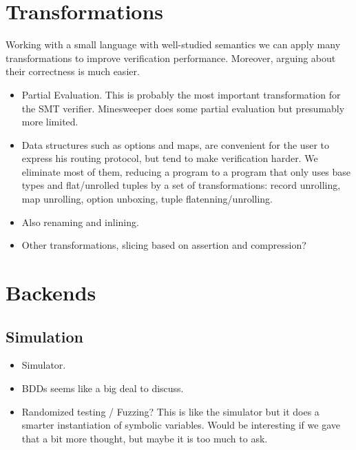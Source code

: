 \documentclass[sigconf,10pt]{acmart}
\begin{document}
%
%
%
%
\section{Transformations}
\label{sec:transformations}

Working with a small language with well-studied semantics we can apply many
transformations to improve verification performance. Moreover, arguing about their correctness is much easier.
\begin{itemize}
  \item Partial Evaluation. This is probably the most important transformation for the SMT verifier. Minesweeper does some partial evaluation but presumably more limited.
  \item Data structures such as options and maps, are convenient for the user to express his routing protocol, but tend to make verification harder. We eliminate most of them, reducing a program to a program that only uses base types and flat/unrolled tuples by a set of transformations: record unrolling, map unrolling, option unboxing, tuple flatenning/unrolling.
  \item Also renaming and inlining.
  \item Other transformations, slicing based on assertion and compression?
\end{itemize}



%
%
%
%

\section{Backends}
\label{sec:backends}


\subsection{Simulation}
\begin{itemize}
  \item Simulator.
  \item BDDs seems like a big deal to discuss.
  \item Randomized testing / Fuzzing? This is like the simulator but it does a smarter instantiation of symbolic variables. Would be interesting if we gave that a bit more thought, but maybe it is too much to ask.
\end{itemize}
\end{document}
